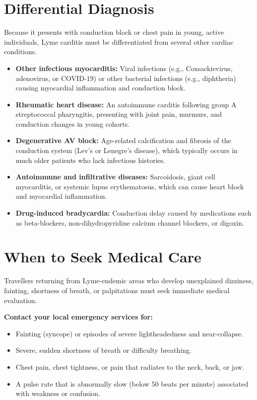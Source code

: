 \section*{Differential Diagnosis}
Because it presents with conduction block or chest pain in young, active individuals, Lyme carditis must be differentiated from several other cardiac conditions.

\begin{itemize}
    \item \textbf{Other infectious myocarditis:} Viral infections (e.g., Coxsackievirus, adenovirus, or COVID-19) or other bacterial infections (e.g., diphtheria) causing myocardial inflammation and conduction block.
    \item \textbf{Rheumatic heart disease:} An autoimmune carditis following group A streptococcal pharyngitis, presenting with joint pain, murmurs, and conduction changes in young cohorts.
    \item \textbf{Degenerative AV block:} Age-related calcification and fibrosis of the conduction system (Lev's or Lenegre's disease), which typically occurs in much older patients who lack infectious histories.
    \item \textbf{Autoimmune and infiltrative diseases:} Sarcoidosis, giant cell myocarditis, or systemic lupus erythematosus, which can cause heart block and myocardial inflammation.
    \item \textbf{Drug-induced bradycardia:} Conduction delay caused by medications such as beta-blockers, non-dihydropyridine calcium channel blockers, or digoxin.
\end{itemize}

\section*{When to Seek Medical Care}
Travellers returning from Lyme-endemic areas who develop unexplained dizziness, fainting, shortness of breath, or palpitations must seek immediate medical evaluation.

\textbf{Contact your local emergency services for:}
\begin{itemize}
    \item Fainting (syncope) or episodes of severe lightheadedness and near-collapse.
    \item Severe, sudden shortness of breath or difficulty breathing.
    \item Chest pain, chest tightness, or pain that radiates to the neck, back, or jaw.
    \item A pulse rate that is abnormally slow (below 50 beats per minute) associated with weakness or confusion.
\end{itemize}

